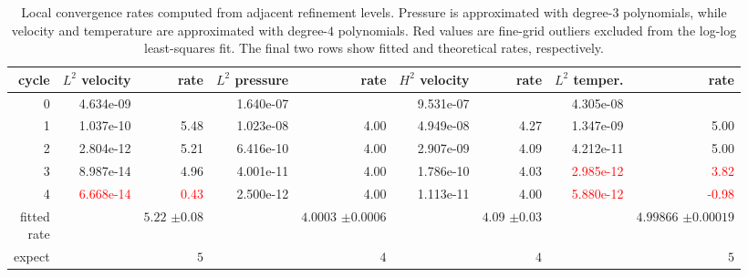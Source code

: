 \begin{table}[htbp]
\centering
\begin{tabular}{|r|r|r|r|r|r|r|r|r|}
\hline
cycle & \makecell{$L^{2}$\\velocity} & rate & \makecell{$L^{2}$\\pressure} & rate & \makecell{$H^{2}$\\velocity} & rate & \makecell{$L^{2}$\\temper.} & rate \\ \hline
0 & 4.634e-09 & \makecell{--} & 1.640e-07 & \makecell{--} & 9.531e-07 & \makecell{--} & 4.305e-08 & \makecell{--} \\ \hline
1 & 1.037e-10 & 5.48 & 1.023e-08 & 4.00 & 4.949e-08 & 4.27 & 1.347e-09 & 5.00 \\ \hline
2 & 2.804e-12 & 5.21 & 6.416e-10 & 4.00 & 2.907e-09 & 4.09 & 4.212e-11 & 5.00 \\ \hline
3 & 8.987e-14 & 4.96 & 4.001e-11 & 4.00 & 1.786e-10 & 4.03 & \textcolor{red}{2.985e-12} & \textcolor{red}{3.82} \\ \hline
4 & \textcolor{red}{6.668e-14} & \textcolor{red}{0.43} & 2.500e-12 & 4.00 & 1.113e-11 & 4.00 & \textcolor{red}{5.880e-12} & \textcolor{red}{-0.98} \\ \hline
\makecell[r]{fitted\\rate} & \makecell{--} & \makecell[r]{$5.22 $\\$\pm  0.08$} & \makecell{--} & \makecell[r]{$4.0003 $\\$\pm  0.0006$} & \makecell{--} & \makecell[r]{$4.09 $\\$\pm  0.03$} & \makecell{--} & \makecell[r]{$4.99866 $\\$\pm  0.00019$} \\ \hline
expect & \makecell{--} & $5$ & \makecell{--} & $4$ & \makecell{--} & $4$ & \makecell{--} & $5$ \\ \hline
\end{tabular}
\caption{Local convergence rates computed from adjacent refinement levels. Pressure is approximated with degree-$3$ polynomials, while velocity and temperature are approximated with degree-$4$ polynomials. Red values are fine-grid outliers excluded from the log-log least-squares fit. The final two rows show fitted and theoretical rates, respectively.}
\end{table}
